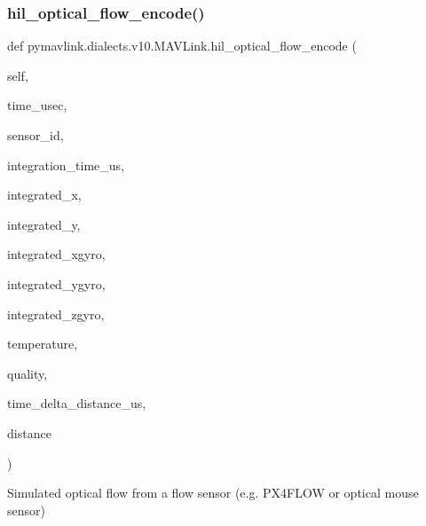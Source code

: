 \begin{DoxyVerb}
\begin{DoxyVerb}
\subsubsection{\texorpdfstring{hil\+\_\+optical\+\_\+flow\+\_\+encode()}{hil\_optical\_flow\_encode()}}
{\footnotesize\ttfamily def pymavlink.\+dialects.\+v10.\+M\+A\+V\+Link.\+hil\+\_\+optical\+\_\+flow\+\_\+encode (\begin{DoxyParamCaption}\item[{}]{self,  }\item[{}]{time\+\_\+usec,  }\item[{}]{sensor\+\_\+id,  }\item[{}]{integration\+\_\+time\+\_\+us,  }\item[{}]{integrated\+\_\+x,  }\item[{}]{integrated\+\_\+y,  }\item[{}]{integrated\+\_\+xgyro,  }\item[{}]{integrated\+\_\+ygyro,  }\item[{}]{integrated\+\_\+zgyro,  }\item[{}]{temperature,  }\item[{}]{quality,  }\item[{}]{time\+\_\+delta\+\_\+distance\+\_\+us,  }\item[{}]{distance }\end{DoxyParamCaption})}

\begin{DoxyVerb}Simulated optical flow from a flow sensor (e.g. PX4FLOW or optical
mouse sensor)


\end{DoxyVerb}
\end{DoxyVerb}
\end{DoxyVerb}
